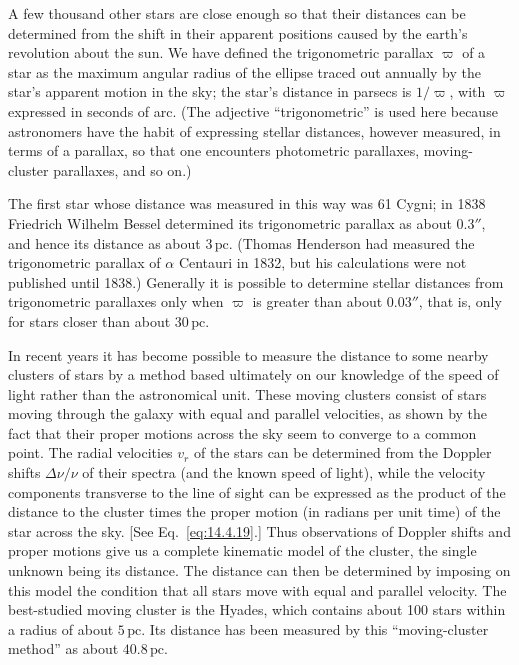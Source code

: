 A few thousand other stars are close enough so that their distances can be
determined from the shift in their apparent positions caused by the earth's
revolution about the sun. We have defined the trigonometric parallax
\(\varpi\) of a star as the maximum angular radius of the ellipse traced out
annually by the star's apparent motion in the sky; the star's distance in
parsecs is \(1/\varpi\), with \(\varpi\) expressed in seconds of arc. (The
adjective ``trigonometric'' is used here because astronomers have the habit
of expressing stellar distances, however measured, in terms of a parallax,
so that one encounters photometric parallaxes, moving-cluster parallaxes,
and so on.)



The first star whose distance was measured in this way was 61 Cygni; in 1838
Friedrich Wilhelm Bessel determined its trigonometric parallax as about
\(0.3''\), and hence its distance as about \(3\,\mathrm{pc}\). (Thomas
Henderson had measured the trigonometric parallax of \(\alpha\) Centauri in
1832, but his calculations were not published until 1838.) Generally it is
possible to determine stellar distances from trigonometric parallaxes only
when \(\varpi\) is greater than about \(0.03''\), that is, only for stars
closer than about \(30\,\mathrm{pc}\).

In recent years it has become possible to measure the distance to some nearby
clusters of stars by a method based ultimately on our knowledge of the speed
of light rather than the astronomical unit. These moving clusters consist of
stars moving through the galaxy with equal and parallel velocities, as shown
by the fact that their proper motions across the sky seem to converge to a
common point. The radial velocities \(v_r\) of the stars can be determined
from the Doppler shifts \(\Delta\nu/\nu\) of their spectra (and the known
speed of light), while the velocity components transverse to the line of
sight can be expressed as the product of the distance to the cluster times
the proper motion (in radians per unit time) of the star across the sky.
[See Eq.~\eqref{eq:14.4.19}.] Thus observations of Doppler shifts and proper
motions give us a complete kinematic model of the cluster, the single
unknown being its distance. The distance can then be determined by imposing
on this model the condition that all stars move with equal and parallel
velocity. The best-studied moving cluster is the Hyades, which contains
about 100 stars within a radius of about \(5\,\mathrm{pc}\). Its distance has
been measured by this ``moving-cluster method'' as about
\(40.8\,\mathrm{pc}\).

